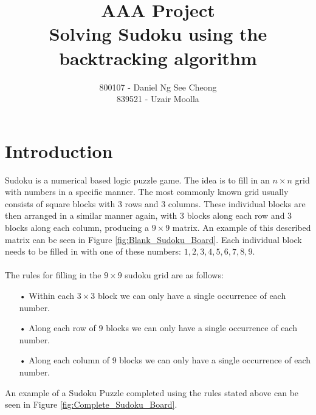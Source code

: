 \documentclass[12pt,a4paper,titlepage]{article}
\author{800107 - Daniel Ng See Cheong\\
		839521 - Uzair Moolla}
\title{
	AAA Project\\
	\large Solving Sudoku using the backtracking algorithm
}
\begin{document}
\maketitle

\section{Introduction}
Sudoku is a numerical based logic puzzle game. The idea is to fill in an $n\times n$ grid with numbers in a specific manner. The most commonly known grid usually consists of square blocks with 3 rows and 3 columns. These individual blocks are then arranged in a similar manner again, with 3 blocks along each row and 3 blocks along each column, producing a $9 \times 9$ matrix. An example of this described matrix can be seen in Figure  \ref{fig:Blank_Sudoku_Board}. Each individual block needs to be filled in  with one of these numbers: ${1,2,3,4,5,6,7,8,9}$.
\\
\\
The rules for filling in the $9 \times 9$ sudoku grid are as follows:
\begin{itemize}
\item[•] Within each $3 \times 3 $ block we can only have a single occurrence of each number.
\item[•] Along each row of $9$ blocks we can only have a single occurrence of each number.
\item[•] Along each column of $9$ blocks we can only have a single occurrence of each number.
\end{itemize}

\noindent
An example of a Sudoku Puzzle completed using the rules stated above can be seen in Figure \ref{fig:Complete_Sudoku_Board}.
\end{document}
